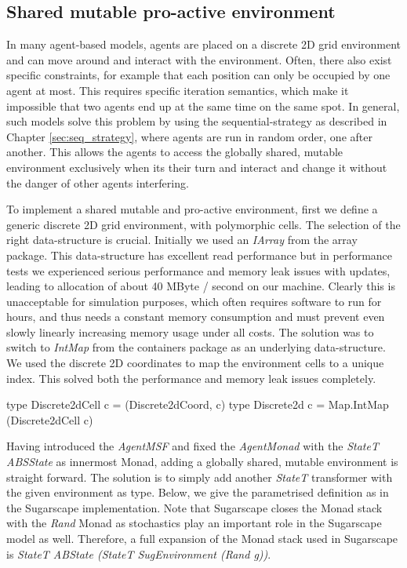 \subsection{Shared mutable pro-active environment}
In many agent-based models, agents are placed on a discrete 2D grid environment and can move around and interact with the environment. Often, there also exist specific constraints, for example that each position can only be occupied by one agent at most. This requires specific iteration semantics, which make it impossible that two agents end up at the same time on the same spot. In general, such models solve this problem by using the sequential-strategy as described in Chapter \ref{sec:seq_strategy}, where agents are run in random order, one after another. This allows the agents to access the globally shared, mutable environment exclusively when its their turn and interact and change it without the danger of other agents interfering.

To implement a shared mutable and pro-active environment, first we define a generic discrete 2D grid environment, with polymorphic cells. The selection of the right data-structure is crucial. Initially we used an \textit{IArray} from the array package. This data-structure has excellent read performance but in performance tests we experienced serious performance and memory leak issues with updates, leading to allocation of about 40 MByte / second on our machine. Clearly this is unacceptable for simulation purposes, which often requires software to run for hours, and thus needs a constant memory consumption and must prevent even slowly linearly increasing memory usage under all costs. The solution was to switch to \textit{IntMap} from the containers package as an underlying data-structure. We used the discrete 2D coordinates to map the environment cells to a unique index. This solved both the performance and memory leak issues completely.

\begin{HaskellCode}
type Discrete2dCell c = (Discrete2dCoord, c)
type Discrete2d c     = Map.IntMap (Discrete2dCell c)
\end{HaskellCode}

Having introduced the \textit{AgentMSF} and fixed the \textit{AgentMonad} with the \textit{StateT ABSState} as innermost Monad, adding a globally shared, mutable environment is straight forward. The solution is to simply add another \textit{StateT} transformer with the given environment as type. Below, we give the parametrised definition as in the Sugarscape implementation. Note that Sugarscape closes the Monad stack with the \textit{Rand} Monad as stochastics play an important role in the Sugarscape model as well. Therefore, a full expansion of the Monad stack used in Sugarscape is  \textit{StateT ABState (StateT SugEnvironment (Rand g))}.

